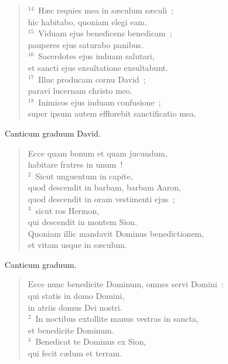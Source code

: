 \begin{flushleft}
\begin{verse}
${}^{14}$~H\ae c requies mea in s\ae culum s\ae culi~;\\ hic habitabo, quoniam elegi eam.\\
${}^{15}$~Viduam ejus benedicens benedicam~;\\ pauperes ejus saturabo panibus.\\
${}^{16}$~Sacerdotes ejus induam salutari,\\ et sancti ejus exsultatione exsultabunt.\\
${}^{17}$~Illuc producam cornu David~;\\ paravi lucernam christo meo.\\
${}^{18}$~Inimicos ejus induam confusione~;\\ super ipsum autem efflorebit sanctificatio mea.\end{verse}\end{flushleft}



\lettrine[lines=3,image=true,loversize=0.05,lraise=-0.03]{C}{}anticum graduum David. \begin{flushleft}\begin{verse}\vspace{6pt}Ecce quam bonum et quam jucundum,\\ habitare fratres in unum~!\\
${}^{2}$~Sicut unguentum in capite,\\ quod descendit in barbam, barbam Aaron,\\ quod descendit in oram vestimenti ejus~;\\
${}^{3}$~sicut ros Hermon,\\ qui descendit in montem Sion.\\ Quoniam illic mandavit Dominus benedictionem,\\ et vitam usque in s\ae culum.\end{verse}\end{flushleft}



\lettrine[lines=3,image=true,loversize=0.05,lraise=-0.03]{C}{}anticum graduum. \begin{flushleft}\begin{verse}\vspace{6pt}Ecce nunc benedicite Dominum, omnes servi Domini~:\\ qui statis in domo Domini,\\ in atriis domus Dei nostri.\\
${}^{2}$~In noctibus extollite manus vestras in sancta,\\ et benedicite Dominum.\\
${}^{3}$~Benedicat te Dominus ex Sion,\\ qui fecit c\ae lum et terram.\end{verse}\end{flushleft}



